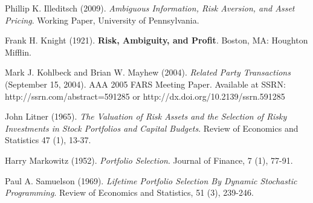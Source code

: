 \documentclass[10pt]{article}
\begin{document}
\begin{thebibliography}{99}
 Phillip K. Illeditsch (2009). {\it Ambiguous Information, Risk Aversion, and Asset Pricing}. Working Paper, University of Pennsylvania.



 Frank H. Knight (1921). {\bf Risk, Ambiguity, and Profit}. Boston, MA: Houghton Mifflin.

 Mark J. Kohlbeck and Brian W. Mayhew (2004). {\it Related Party Transactions} (September 15, 2004). AAA 2005 FARS Meeting Paper. Available at SSRN: http://ssrn.com/abstract=591285 or http://dx.doi.org/10.2139/ssrn.591285

 John Litner (1965). {\it The Valuation of Risk Assets and the Selection of Risky Investments in Stock Portfolios and Capital Budgets}. Review of Economics and Statistics 47 (1), 13-37.


 Harry Markowitz (1952). {\it Portfolio Selection}. Journal of Finance, 7 (1), 77-91.





 Paul A. Samuelson (1969). {\it Lifetime Portfolio Selection By Dynamic Stochastic Programming}. Review of Economics and Statistics, 51 (3), 239-246.


\end{thebibliography}
\end{document}
